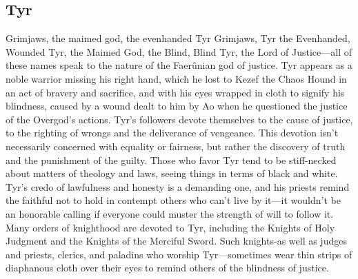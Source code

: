\documentclass[10pt,a4paper,twoside,twocolumn,openany,bg=print,nodeprecatedcode]{dndbook}
\begin{document}
\subsection{Tyr}
Grimjaws, the maimed god, the evenhanded
Tyr Grimjaws, Tyr the Evenhanded, Wounded Tyr, the Maimed God, the Blind, Blind Tyr, the Lord of Justice—all of these names speak to the nature of the Faerûnian god of justice. Tyr appears as a noble warrior missing his right hand, which he lost to Kezef the Chaos Hound in an act of bravery and sacrifice, and with his eyes wrapped in cloth to signify his blindness, caused by a wound dealt to him by Ao when he questioned the justice of the Overgod's actions.
Tyr's followers devote themselves to the cause of justice, to the righting of wrongs and the deliverance of vengeance. This devotion isn't necessarily concerned with equality or fairness, but rather the discovery of truth and the punishment of the guilty. Those who favor Tyr tend to be stiff-necked about matters of theology and laws, seeing things in terms of black and white. Tyr's credo of lawfulness and honesty is a demanding one, and his priests remind the faithful not to hold in contempt others who can't live by it—it wouldn't be an honorable calling if everyone could muster the strength of will to follow it.
Many orders of knighthood are devoted to Tyr, including the Knights of Holy Judgment and the Knights of the Merciful Sword. Such knights-as well as judges and priests, clerics, and paladins who worship Tyr—sometimes wear thin strips of diaphanous cloth over their eyes to remind others of the blindness of justice.
\end{document}
